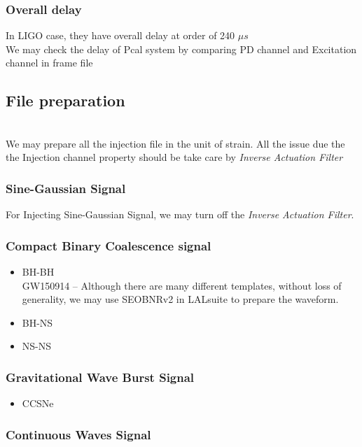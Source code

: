     \subsubsection{Overall delay}
In LIGO case, they have overall delay at order of 240 $\mu s$ \cite{ligo:inj}\\
We may check the delay of Pcal system by comparing PD channel and Excitation channel in frame file


\subsection{File preparation}
\\
We may prepare all the injection file in the unit of strain. All the issue due the the Injection channel property should be take care by \emph{Inverse Actuation Filter}
    \subsubsection{Sine-Gaussian Signal}
    For Injecting Sine-Gaussian Signal, we may turn off the \emph{Inverse Actuation Filter}.
    
    
    \subsubsection{Compact Binary Coalescence signal}
        \begin{itemize}
            \item BH-BH\\
            GW150914 -- Although there are many different templates, without loss of generality, we may use SEOBNRv2 in LALsuite to prepare the waveform.
            \item BH-NS
            \item NS-NS\\
        \end{itemize}
    \subsubsection{Gravitational Wave Burst Signal}
        \begin{itemize}
            \item CCSNe
        \end{itemize}
    \subsubsection{Continuous Waves Signal}

